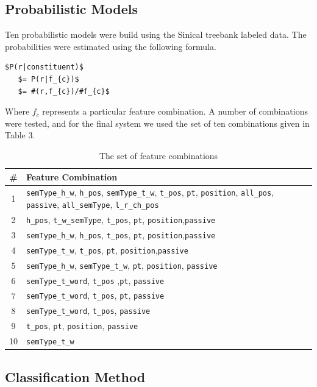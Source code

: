 \documentclass[11pt]{article}
\begin{document}
\subsection{Probabilistic Models}
Ten probabilistic models were build using the Sinical treebank labeled data. The probabilities were estimated using the following formula. 
\begin{Verbatim}[commandchars=\\\{\},codes={\catcode`$=3\catcode`_=8}]
  $P(r|constituent)$  
   $= P(r|f_{c})$
   $= #(r,f_{c})/#f_{c}$
\end{Verbatim} 
Where $f_c$ represents a particular feature combination. A number of combinations were tested, and for the final system we used the set of ten combinations given in Table 3.
\begin{table}[!h]
\small
\begin{tabular}{|c|p{6.5cm}|}
\hline \textbf{\#} & \textbf{Feature Combination} \\ 
\hline 1 & \verb+semType_h_w+, \verb+h_pos+, \verb+semType_t_w+, \verb+t_pos+, \verb+pt+, \verb+position+, \verb+all_pos+, \verb+passive+, \verb+all_semType+, \verb+l_r_ch_pos+ \\ 
\hline 2 & \verb+h_pos+, \verb+t_w_semType+, \verb+t_pos+, \verb+pt+, \verb+position+,\verb+passive+\\ 
\hline 3 & \verb+semType_h_w+, \verb+h_pos+, \verb+t_pos+, \verb+pt+, \verb+position+,\verb+passive+\\  
\hline 4 &  \verb+semType_t_w+, \verb+t_pos+, \verb+pt+, \verb+position+,\verb+passive+\\   
\hline 5 &  \verb+semType_h_w+, \verb+semType_t_w+, \verb+pt+, \verb+position+, \verb+passive+\\ 
\hline 6 &  \verb+semType_t_word+, \verb+t_pos+ ,\verb+pt+, \verb+passive+\\ 
\hline 7 &  \verb+semType_t_word+, \verb+t_pos+, \verb+pt+, \verb+passive+ \\ 
\hline 8 &  \verb+semType_t_word+, \verb+t_pos+, \verb+passive+ \\ 
\hline 9 & \verb+t_pos+, \verb+pt+, \verb+position+, \verb+passive+ \\ 
\hline 10  & \verb+semType_t_w+ \\ 
\hline 
\end{tabular} %
\caption{The set of feature combinations}
\normalsize
\end{table}
\subsection{Classification Method}
\end{document}
